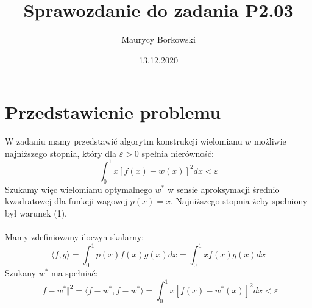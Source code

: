 \documentclass{article}
\title{Sprawozdanie do zadania \textbf{P2.03}}
\date{13.12.2020}
\author{Maurycy Borkowski}
\begin{document}
\maketitle
\section{Przedstawienie problemu}
W zadaniu mamy przedstawić algorytm konstrukcji wielomianu $w$ możliwie najniższego stopnia, który dla $\varepsilon > 0$ spełnia nierówność:
\begin{equation}
\int_0^1 x[f(x) - w(x)]^2 dx < \varepsilon
\end{equation}
Szukamy więc wielomianu optymalnego $w^*$ w sensie aproksymacji średnio kwadratowej dla funkcji wagowej $p(x) = x$. Najniższego stopnia żeby spełniony był warunek (1).\\\\
Mamy zdefiniowany iloczyn skalarny:
\begin{equation}
\langle f,g\rangle = \int_0^1 p(x)f(x)g(x) dx = \int_0^1 xf(x)g(x) dx
\end{equation}
Szukany $w^*$ ma spełniać:
\begin{equation}
\Vert f - w^*\Vert^2 = \langle f-w^*,f-w^*\rangle = \int_0^1 x[f(x) - w^*(x)]^2 dx < \varepsilon
\end{equation}
\end{document}
